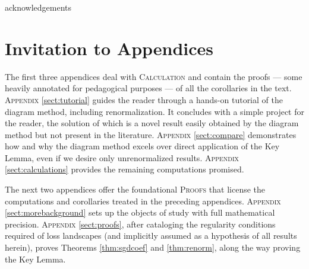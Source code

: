 \documentclass{article}
\theoremstyle{plain}
\theoremstyle{definition}
\begin{document}
{\colorbox{moopink}{\color{mooteal}acknowledgements}}


    
    


\clearpage
\newpage
\renewcommand{\thesection}{\Alph{section}}
\setcounter{section}{0}

\section*{Invitation to Appendices}
    The first three appendices deal with \textsc{Calculation} and contain the
    proofs --- some heavily annotated for pedagogical purposes --- of all the
    corollaries in the text.
    \textsc{Appendix} \ref{sect:tutorial} guides the reader through a hands-on
        tutorial of the diagram method, including renormalization.  It
        concludes with a simple project for the reader, the solution of which
        is a novel result easily obtained by the diagram method but not present
        in the literature. 
    \textsc{Appendix} \ref{sect:compare} demonstrates how and why the diagram
        method excels over direct application of the Key Lemma, even if we
        desire only unrenormalized results.
    \textsc{Appendix} \ref{sect:calculations} provides the remaining
        computations promised.

    The next two appendices offer the foundational \textsc{Proofs} that
    license the computations and corollaries treated in the preceding
    appendices.
    \textsc{Appendix} \ref{sect:morebackground} sets up the objects of study
        with full mathematical precision.
    \textsc{Appendix} \ref{sect:proofs}, after cataloging the regularity
        conditions required of loss landscapes (and implicitly assumed as a
        hypothesis of all results herein), proves Theorems \ref{thm:sgdcoef}
        and \ref{thm:renorm}, along the way proving the Key Lemma.
\end{document}
